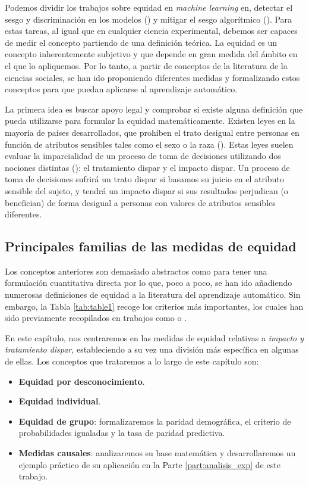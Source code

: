 \documentclass[oneside,openright,titlepage,numbers=noenddot,openany,headinclude,footinclude=true,
cleardoublepage=empty,abstractoff,BCOR=5mm,paper=a4,fontsize=12pt,main=spanish]{scrreprt}
\begin{document}
\clearpage

Podemos dividir los trabajos sobre equidad en \textit{machine learning} en, detectar el sesgo y discriminación en los modelos (\cite{detect2012}) y mitigar el sesgo algorítmico (\cite{mitigate2017}). Para estas tareas, al igual que en cualquier ciencia experimental, debemos ser capaces de medir el concepto partiendo de una definición teórica. La equidad es un concepto inherentemente subjetivo y que depende en gran medida del ámbito en el que lo apliquemos. Por lo tanto, a partir de conceptos de la literatura de la ciencias sociales, se han ido proponiendo diferentes medidas y formalizando estos conceptos para que puedan aplicarse al aprendizaje automático.

La primera idea es buscar apoyo legal y comprobar si existe alguna definición que pueda utilizarse para formular la equidad matemáticamente. Existen leyes en la mayoría de países desarrollados, que prohíben el trato desigual entre personas en función de atributos sensibles tales como el sexo o la raza (\cite{ley1964}). Estas leyes suelen evaluar la imparcialidad de un proceso de toma de decisiones utilizando dos nociones distintas (\cite{bigdata2016}): el tratamiento dispar y el impacto dispar. Un proceso de toma de decisiones sufrirá un trato dispar si basamos su juicio en el atributo sensible del sujeto, y tendrá un impacto dispar si sus resultados perjudican (o benefician) de forma desigual a personas con valores de atributos sensibles diferentes.

\subsection{Principales familias de las medidas de equidad}

Los conceptos anteriores son demasiado abstractos como para tener una formulación cuantitativa directa por lo que, poco a poco, se han ido añadiendo numerosas definiciones de equidad a la literatura del aprendizaje automático. Sin embargo, la Tabla \ref{tab:table1} recoge los criterios más importantes, los cuales han sido previamente recopilados en trabajos como \cite{formalizing2018} o \cite{definitions2018}.  

En este capítulo, nos centraremos en las medidas de equidad relativas a \textit{impacto y tratamiento dispar}, estableciendo a su vez una división más específica en algunas de ellas. Los conceptos que trataremos a lo largo de este capítulo son:

\begin{itemize}
    \item \textbf{Equidad por desconocimiento}.
    \item \textbf{Equidad individual}.
    \item \textbf{Equidad de grupo}: formalizaremos la paridad demográfica, el criterio de probabilidades igualadas y la tasa de paridad predictiva.
    \item \textbf{Medidas causales}: analizaremos su base matemática y desarrollaremos un ejemplo práctico de su aplicación en la Parte \ref{part:analisis_exp} de este trabajo. \vspace{2mm}
\end{itemize}
\end{document}

